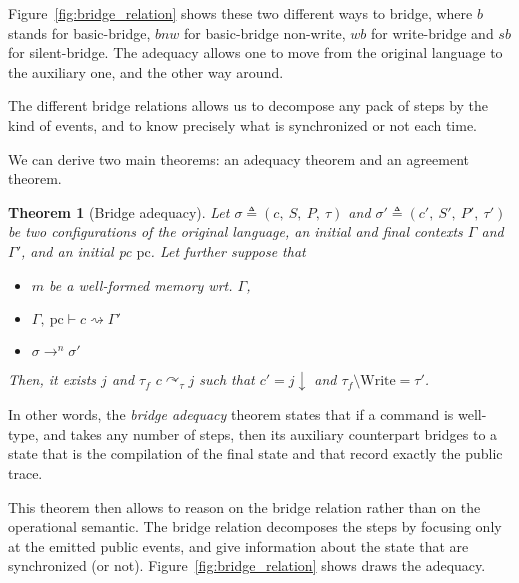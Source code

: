 \documentclass[10pt]{article}
\newcommand{\pc}{\mathrm{pc}}
\newcommand{\ctx}{\Gamma}
\newcommand{\conf}{\sigma}
\newcommand{\typing}[4]{ #1,~#2 \vdash #3 \rightsquigarrow #4}
\newcommand{\execn}[3] { #1 \rightarrow^{#2} #3 }
\newcommand{\bridge}[3] { #1 \curvearrowright_{#2} #3 }
\newcommand{\compile}[1]{ #1 \downarrow }
\newtheorem{theorem}{Theorem}
\begin{document}
Figure~\ref{fig:bridge_relation} shows these two different ways to bridge, where $b$ stands for
basic-bridge, $bnw$ for basic-bridge non-write, $wb$ for write-bridge and $sb$ for silent-bridge.
The adequacy allows one to move from the original language to the auxiliary one, and the other way around.

The different bridge relations allows us to decompose any pack of steps by the kind of events, and
to know precisely what is synchronized or not each time.

We can derive two main theorems: an adequacy theorem and an agreement theorem.
\begin{theorem}[Bridge adequacy]\label{thm:adequacy}
  Let $\conf \triangleq (c,~S,~P,~\tau)$ and $\conf' \triangleq (c',~S',~P',~\tau')$ be two
  configurations of the original language, an initial and final contexts $\ctx$ and $\ctx'$, and an
  initial pc $\pc$.
  Let further suppose that

 \begin{itemize}
   \item $m$ be a well-formed memory wrt. $\ctx$,
   \item \(\typing{\ctx}{\pc}{c}{\ctx'} \)
   \item \( \execn{\conf}{n}{\conf'} \)
 \end{itemize}

  Then, it exists $j$ and $\tau_{f}$ \( \bridge{c}{\tau}{j} \) such that $c' = \compile{j}$ and $\tau_{f} \setminus \mathrm{Write} = \tau'$.
\end{theorem}

In other words, the \emph{bridge adequacy} theorem states that if a command is well-type, and takes
any number of steps, then its auxiliary counterpart bridges to a state that is the compilation of
the final state and that record exactly the public trace.

This theorem then allows to reason on the bridge relation rather than on the operational semantic.
The bridge relation decomposes the steps by focusing only at the emitted public events, and give
information about the state that are synchronized (or not).
Figure~\ref{fig:bridge_relation} shows draws the adequacy.


\end{document}
